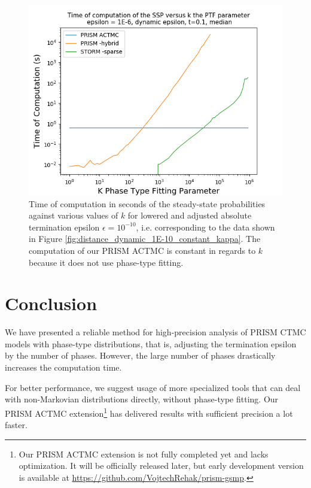 \documentclass{article}
\numberwithin{equation}{section}		%
\numberwithin{figure}{section}			%
\numberwithin{table}{section}				%
\begin{document}
	\begin{figure}[H]
		\begin{center}
			\includegraphics[trim=0.2cm 0cm 0cm 1.35cm,width=15cm, clip]{picture/New_model/1E-6/performance_dynamic.png}
		\end{center}
		\caption{Time of computation in seconds of the steady-state probabilities against various values of $k$ for lowered and adjusted absolute termination epsilon $\epsilon = 10^{-10}$, i.e. corresponding to the data shown in Figure \ref{fig:distance_dynamic_1E-10_constant_kappa}. The computation of our PRISM ACTMC is constant in regards to $k$ because it does not use phase-type fitting. }
		\label{fig:performance_dynamic}
	\end{figure}
	
	\section{Conclusion}
	We have presented a reliable method for high-precision analysis of PRISM CTMC models with phase-type distributions, that is, adjusting the termination epsilon by the number of phases. However, the large number of phases drastically increases the computation time.
	
	For better performance, we suggest usage of more specialized tools that can deal with non-Markovian distributions directly, without phase-type fitting. Our PRISM ACTMC extension\footnote{Our PRISM ACTMC extension is not fully completed yet and lacks optimization. It will be officially released later, but early development version is available at \href{https://github.com/VojtechRehak/prism-gsmp}{https://github.com/VojtechRehak/prism-gsmp}.} has delivered results with sufficient precision a lot faster.
	
\end{document}
